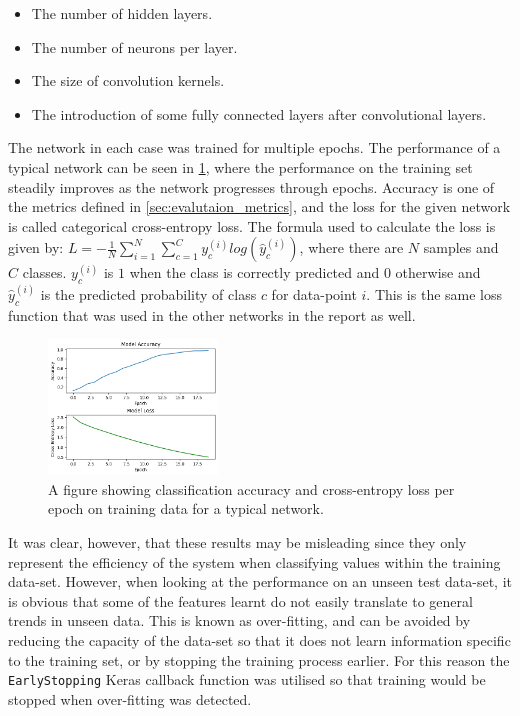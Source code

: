 \begin{itemize}
    \item The number of hidden layers.
    \item The number of neurons per layer.
    \item The size of convolution kernels.
    \item The introduction of some fully connected layers after convolutional layers.
\end{itemize}

The network in each case was trained for multiple epochs. The performance of a typical network can be seen in \cref{fig:accuracy_and_loss_per_epoch}, where the performance on the training set steadily improves as the network progresses through epochs. Accuracy is one of the metrics defined in \cref{sec:evalutaion_metrics}, and the loss for the given network is called categorical cross-entropy loss. The formula used to calculate the loss is given by: $ L = -\frac{1}{N}\sum^N_{i=1}\sum^C_{c=1}y_c^{(i)}log(\hat{y}_c^{(i)}) $, where there are $ N $ samples and $ C $ classes. $ y_c^{(i)} $ is $ 1 $ when the class is correctly predicted and $ 0 $ otherwise and $ \hat{y}_c^{(i)} $ is the predicted probability of class $ c $ for data-point $ i $. This is the same loss function that was used in the other networks in the report as well.

\begin{figure}[htb]
    \centering
    \includegraphics[width=0.4\textwidth]{implementation/images/accuracy_and_loss_per_epoch.png}
    \caption{A figure showing classification accuracy and cross-entropy loss per epoch on training data for a typical network.}
    \label{fig:accuracy_and_loss_per_epoch}
\end{figure}

It was clear, however, that these results may be misleading since they only represent the efficiency of the system when classifying values within the training data-set. However, when looking at the performance on an unseen test data-set, it is obvious that some of the features learnt do not easily translate to general trends in unseen data. This is known as over-fitting, and can be avoided by reducing the capacity of the data-set so that it does not learn information specific to the training set, or by stopping the training process earlier. For this reason the \lstinline{EarlyStopping} Keras callback function was utilised so that training would be stopped when over-fitting was detected.

